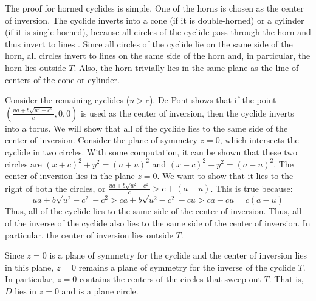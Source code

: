 The proof for horned cyclides is simple.
One of the horns is chosen as the center of inversion.
The cyclide inverts into a cone (if it is double-horned) or a cylinder
(if it is single-horned), because all circles of the cyclide pass through
the horn and thus invert to lines \cite{DEP84}.
Since all circles of the cyclide lie on the same side of the horn,
all circles invert to lines on the same side of the horn and, in particular,
the horn lies outside $T$.
Also, the horn trivially lies in the same plane as the line of centers of the
cone or cylinder.

Consider the remaining cyclides ($u > c$).
De Pont \cite[pp. 36-37]{DEP84} shows that if the point 
$(\frac{ua + b\sqrt{u^{2} - c^{2}}}{c},0,0)$ is used as the center of 
inversion, then the cyclide inverts into a torus.
% 
%
%
We will show that all of the cyclide lies to the same side of the center of
inversion.
Consider the plane of symmetry $z=0$, which intersects the cyclide in 
two circles.
With some computation, it can be shown that these two circles are 
$(x+c)^{2} + y^{2} = (a+u)^{2}$ and $(x-c)^{2} + y^{2} = (a-u)^{2}$.
The center of inversion lies in the plane $z=0$.
We want to show that it lies to the right of both the circles, or
$\frac{ua + b\sqrt{u^{2} - c^{2}}}{c} > c + (a-u)$.
This is true because:
\[ ua + b\sqrt{u^{2} - c^{2}} - c^{2} 
 > ca + b\sqrt{u^{2} - c^{2}} - cu
 > ca - cu = c(a-u) \]
Thus, all of the cyclide lies to the same side of the center of inversion.
Thus, all of the inverse of the cyclide also lies to the same side of the
center of inversion.
In particular, the center of inversion lies outside $T$.

Since $z=0$ is a plane of symmetry for the cyclide
and the center of inversion lies in this plane, 
$z=0$ remains a plane of symmetry for the inverse of the cyclide $T$.
In particular, $z=0$ contains the centers of the circles that sweep out $T$.
That is, $D$ lies in $z=0$ and is a plane circle.
\QED

